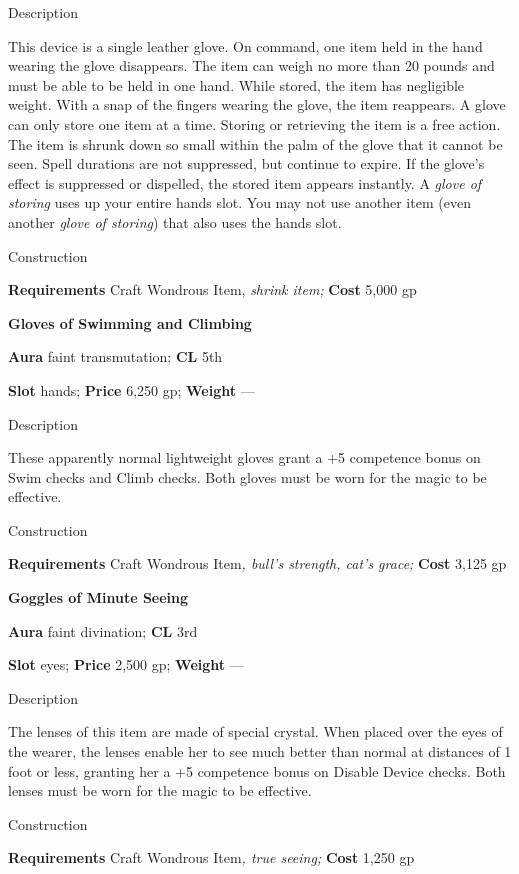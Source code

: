 Description
				
This device is a single leather glove. On command, one item held in the hand wearing the glove disappears. The item can weigh no more than 20 pounds and must be able to be held in one hand. While stored, the item has negligible weight. With a snap of the fingers wearing the glove, the item reappears. A glove can only store one item at a time. Storing or retrieving the item is a free action. The item is shrunk down so small within the palm of the glove that it cannot be seen. Spell durations are not suppressed, but continue to expire. If the glove's effect is suppressed or dispelled, the stored item appears instantly. A \textit{glove of storing }uses up your entire hands slot. You may not use another item (even another \textit{glove of storing}) that also uses the hands slot.
				
Construction
				
\textbf{Requirements} Craft Wondrous Item,\textit{ shrink item;}\textbf{ Cost }5,000 gp
				
\textbf{Gloves of Swimming and Climbing}
				
\textbf{Aura} faint transmutation;\textbf{ CL }5th
				
\textbf{Slot} hands; \textbf{Price} 6,250 gp; \textbf{Weight }---
				
Description
				
These apparently normal lightweight gloves grant a +5 competence bonus on Swim checks and Climb checks. Both gloves must be worn for the magic to be effective. 
				
Construction
				
\textbf{Requirements} Craft Wondrous Item\textit{, bull's strength, cat's grace;}\textbf{ Cost }3,125 gp
				
\textbf{Goggles of Minute Seeing}
				
\textbf{Aura} faint divination;\textbf{ CL }3rd
				
\textbf{Slot} eyes; \textbf{Price }2,500 gp; \textbf{Weight }---
				
Description
				
The lenses of this item are made of special crystal. When placed over the eyes of the wearer, the lenses enable her to see much better than normal at distances of 1 foot or less, granting her a +5 competence bonus on Disable Device checks. Both lenses must be worn for the magic to be effective. 
				
Construction
				
\textbf{Requirements} Craft Wondrous Item\textit{, true seeing;}\textbf{ Cost }1,250 gp
				
